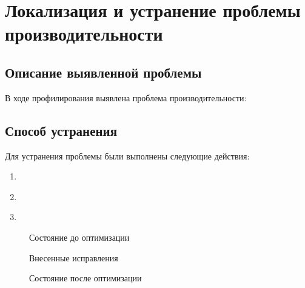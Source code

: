 \documentclass[12pt,a4paper]{article}
\begin{document}
\section{Локализация и устранение проблемы производительности}

\subsection{Описание выявленной проблемы}
В ходе профилирования выявлена проблема производительности:
\underline{\hspace{12cm}}
\newline
\underline{\hspace{12cm}}
\newline
\underline{\hspace{12cm}}

\subsection{Способ устранения}
Для устранения проблемы были выполнены следующие действия:
\begin{enumerate}
    \item \underline{\hspace{11cm}}
    \item \underline{\hspace{11cm}}
    \item \underline{\hspace{11cm}}
\end{enumerate}

\begin{figure}[h]
\centering
{}
\caption{Состояние до оптимизации}
\end{figure}

\begin{figure}[h]
\centering
{}
\caption{Внесенные исправления}
\end{figure}

\begin{figure}[h]
\centering
{}
\caption{Состояние после оптимизации}
\end{figure}
\end{document}
